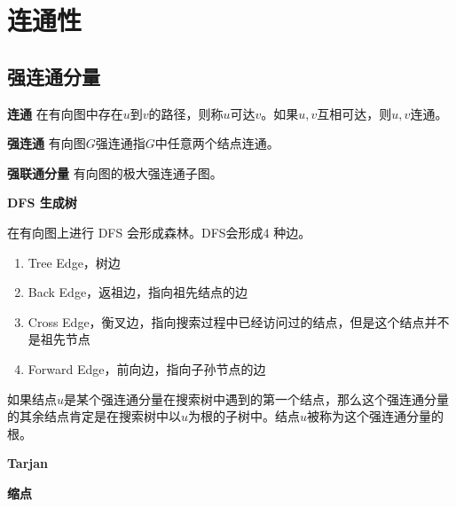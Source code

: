 \section{连通性}
\subsection{强连通分量}
\textbf{连通} 在有向图中存在$u$到$v$的路径，则称$u$可达$v$。如果$u,v$互相可达，则$u,v$连通。

\textbf{强连通} 有向图$G$强连通指$G$中任意两个结点连通。

\textbf{强联通分量} 有向图的极大强连通子图。

\textbf{DFS 生成树}

在有向图上进行 DFS 会形成森林。DFS会形成4 种边。
\begin{enumerate}
    \item Tree Edge，树边
    \item Back Edge，返祖边，指向祖先结点的边
    \item Cross Edge，衡叉边，指向搜索过程中已经访问过的结点，但是这个结点并不是祖先节点
    \item Forward Edge，前向边，指向子孙节点的边
\end{enumerate}

如果结点$u$是某个强连通分量在搜索树中遇到的第一个结点，那么这个强连通分量的其余结点肯定是在搜索树中以$u$为根的子树中。结点$u$被称为这个强连通分量的根。

\textbf{Tarjan}



\textbf{缩点}

